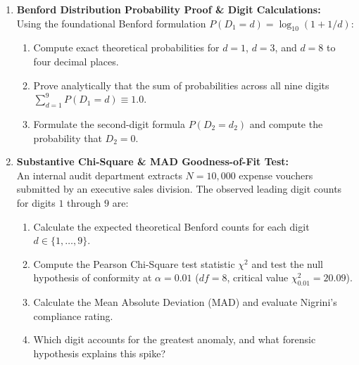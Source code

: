 \begin{enumerate}[label=\textbf{P5.\arabic*}]
    \item \textbf{Benford Distribution Probability Proof \& Digit Calculations:}\\
    Using the foundational Benford formulation $P(D_1 = d) = \log_{10}(1 + 1/d)$:
    \begin{enumerate}[label=(\alph*)]
        \item Compute exact theoretical probabilities for $d = 1$, $d = 3$, and $d = 8$ to four decimal places.
        \item Prove analytically that the sum of probabilities across all nine digits $\sum_{d=1}^9 P(D_1 = d) \equiv 1.0$.
        \item Formulate the second-digit formula $P(D_2 = d_2)$ and compute the probability that $D_2 = 0$.
    \end{enumerate}

    \item \textbf{Substantive Chi-Square \& MAD Goodness-of-Fit Test:}\\
    An internal audit department extracts $N = 10{,}000$ expense vouchers submitted by an executive sales division. The observed leading digit counts for digits $1$ through $9$ are:
    \begin{equation*}
    [2100, 1400, 1100, 1900, 1300, 800, 600, 450, 350]
    \end{equation*}
    \begin{enumerate}[label=(\alph*)]
        \item Calculate the expected theoretical Benford counts for each digit $d \in \{1, \dots, 9\}$.
        \item Compute the Pearson Chi-Square test statistic $\chi^2$ and test the null hypothesis of conformity at $\alpha = 0.01$ ($df = 8$, critical value $\chi^2_{0.01} = 20.09$).
        \item Calculate the Mean Absolute Deviation (MAD) and evaluate Nigrini's compliance rating.
        \item Which digit accounts for the greatest anomaly, and what forensic hypothesis explains this spike?
    \end{enumerate}


\end{enumerate}
